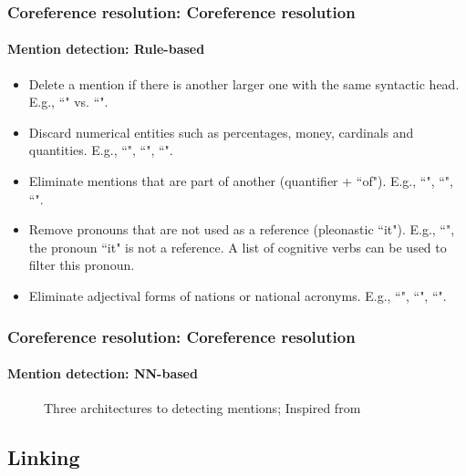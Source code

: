 \documentclass[xcolor=table]{beamer}
\begin{document}
\begin{frame}
	\frametitle{Coreference resolution: Coreference resolution}
	\framesubtitle{Mention detection: Rule-based \cite{2013-lee-al}}
	
	\begin{itemize}
		\item Delete a mention if there is another larger one with the same syntactic head. 
		E.g., ``" vs. ``". 
		
		\item Discard numerical entities such as percentages, money, cardinals and quantities.
		E.g., ``", ``", ``".
		
		\item Eliminate mentions that are part of another (quantifier + ``of"). 
		E.g., ``", ``", ``".
		
		\item Remove pronouns that are not used as a reference (pleonastic ``it"). 
		E.g., ``", the pronoun ``it" is not a reference. 
		A list of cognitive verbs  can be used to filter this pronoun.
		
		\item Eliminate adjectival forms of nations or national acronyms.
		E.g., ``", ``", ``".
		
	\end{itemize}
	
\end{frame}


\begin{frame}
	\frametitle{Coreference resolution: Coreference resolution}
	\framesubtitle{Mention detection: NN-based \cite{2020-yu-al}}
	
	\begin{figure}[ht]
		\centering
		\caption[Three architectures to detecting mentions]{Three architectures to detecting mentions; Inspired from \cite{2020-yu-al}}
		\label{fig:det-mention-yu}
	\end{figure}
	
\end{frame}



\subsection{Linking}
\end{document}
